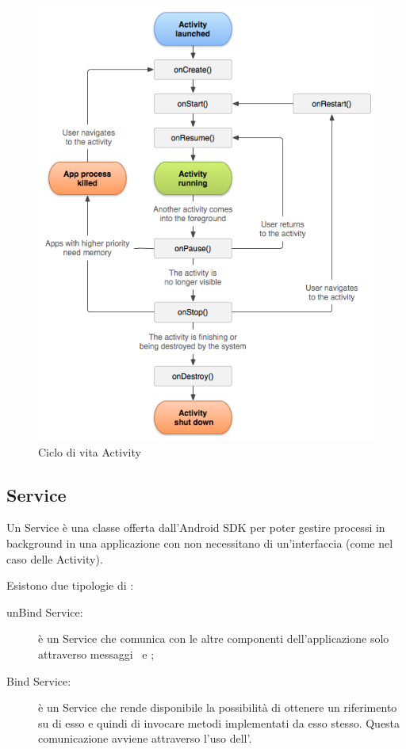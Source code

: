 \documentclass[../ManualeSviluppatore.tex]{subfiles}
\begin{document}
\begin{appendices}
				\begin{figure} [p]
					\centering
					\includegraphics[width=\textwidth]{img/ActivityCiclo}
					\caption{Ciclo di vita Activity}
					\label{fig:ActivityCiclo}
				\end{figure}
			
		\subsection{Service}
			Un Service è una classe offerta dall'Android SDK per poter gestire processi in background in una applicazione con non necessitano di un'interfaccia (come nel caso delle Activity).
		
		Esistono due tipologie di \Service:
			\begin{description}
				\item [unBind Service:] è un Service che comunica con le altre componenti dell'applicazione solo attraverso messaggi \Intent\ e \BroadcastReceiver;
				\item [Bind Service:] è un Service che rende disponibile la possibilità di ottenere un riferimento su di esso e quindi di invocare metodi implementati da esso stesso. Questa comunicazione avviene attraverso l'uso dell'\IBinder.
			\end{description}
		

\end{appendices}
\end{document}
